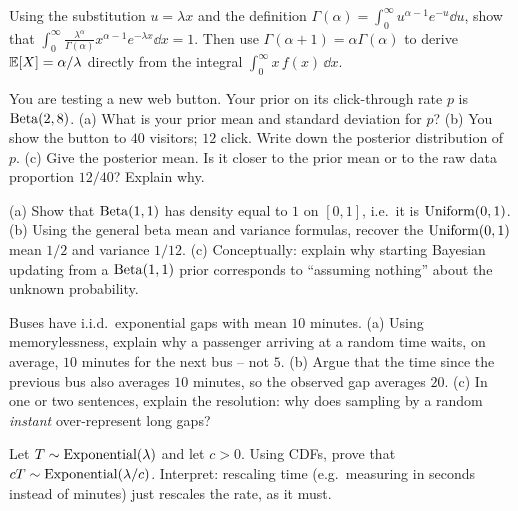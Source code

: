 \begin{exercise}
\label{ch11:exr-gammaconst}
Using the substitution $u=\lambda x$ and the definition
$\Gamma(\alpha)=\int_0^\infty u^{\alpha-1}e^{-u}\dd u$, show that
$\int_0^\infty \frac{\lambda^\alpha}{\Gamma(\alpha)} x^{\alpha-1}e^{-\lambda x}\dd x = 1$.
Then use $\Gamma(\alpha+1)=\alpha\Gamma(\alpha)$ to derive $\operatorname{\mathbb{E}}[X]=\alpha/\lambda$
directly from the integral $\int_0^\infty x\,f(x)\,\dd x$.
\end{exercise}

\begin{exercise}
\label{ch11:exr-beta}
You are testing a new web button. Your prior on its click-through rate $p$ is
$\operatorname{Beta}(2,8)$. (a) What is your prior mean and standard deviation for $p$? (b) You
show the button to $40$ visitors; $12$ click. Write down the posterior
distribution of $p$. (c) Give the posterior mean. Is it closer to the prior mean
or to the raw data proportion $12/40$? Explain why.
\end{exercise}

\begin{exercise}
\label{ch11:exr-unifbeta}
(a) Show that $\operatorname{Beta}(1,1)$ has density equal to $1$ on $[0,1]$, i.e.\ it is
$\operatorname{Uniform}(0,1)$. (b) Using the general beta mean and variance formulas, recover the
$\operatorname{Uniform}(0,1)$ mean $1/2$ and variance $1/12$. (c) Conceptually: explain why
starting Bayesian updating from a $\operatorname{Beta}(1,1)$ prior corresponds to ``assuming
nothing'' about the unknown probability.
\end{exercise}

\begin{exercise}
\label{ch11:exr-paradox}
Buses have i.i.d.\ exponential gaps with mean $10$ minutes. (a) Using
memorylessness, explain why a passenger arriving at a random time waits, on
average, $10$ minutes for the next bus -- not $5$. (b) Argue that the time since
the previous bus also averages $10$ minutes, so the observed gap averages $20$.
(c) In one or two sentences, explain the resolution: why does sampling by a
random \emph{instant} over-represent long gaps?
\end{exercise}

\begin{exercise}
\label{ch11:exr-scale}
Let $T\sim\operatorname{Exponential}(\lambda)$ and let $c>0$. Using CDFs, prove that
$cT\sim\operatorname{Exponential}(\lambda/c)$. Interpret: rescaling time (e.g.\ measuring in seconds
instead of minutes) just rescales the rate, as it must.
\end{exercise}

